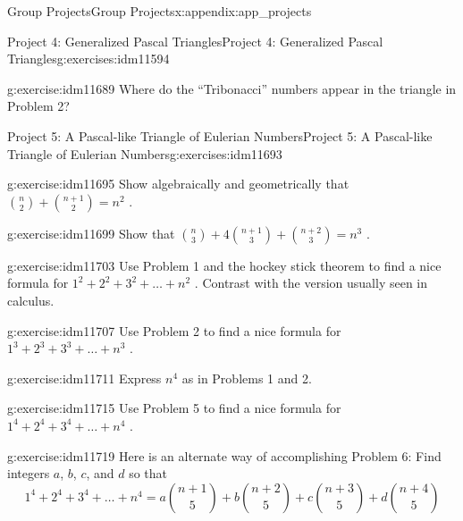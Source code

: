 \documentclass[oneside,10pt,]{book}
\numberwithin{equation}{chapter}
\begin{document}
\begin{appendixptx}{Group Projects}{}{Group Projects}{}{}{x:appendix:app_projects}
\begin{exercises-section-numberless}{Project 4: Generalized Pascal Triangles}{}{Project 4: Generalized Pascal Triangles}{}{}{g:exercises:idm11594}
\begin{divisionexercise}{8}{}{}{g:exercise:idm11689}%
Where do the ``Tribonacci'' numbers appear in the triangle in Problem 2?%
\end{divisionexercise}%
\end{exercises-section-numberless}
%
%
\typeout{************************************************}
\typeout{************************************************}
%
\begin{exercises-section-numberless}{Project 5: A Pascal-like Triangle of Eulerian Numbers}{}{Project 5: A Pascal-like Triangle of Eulerian Numbers}{}{}{g:exercises:idm11693}
\begin{divisionexercise}{1}{}{}{g:exercise:idm11695}%
Show algebraically and geometrically that \(\binom{n}{2}
+
\binom{n + 1}{2}
= n^{2}\) .%
\end{divisionexercise}%
\begin{divisionexercise}{2}{}{}{g:exercise:idm11699}%
Show that \(\binom{n}{3}
+ 4
\binom{n + 1}{3}
+
\binom{n + 2}{3}
= n^{3}\) .%
\end{divisionexercise}%
\begin{divisionexercise}{3}{}{}{g:exercise:idm11703}%
Use Problem 1 and the hockey stick theorem to find a nice formula for \(1^{2} + 2^{2} + 3^{2} + \ldots + n^{2}\) . Contrast with the version usually seen in calculus.%
\end{divisionexercise}%
\begin{divisionexercise}{4}{}{}{g:exercise:idm11707}%
Use Problem 2 to find a nice formula for \(1^{3} + 2^{3} + 3^{3} + \ldots + n^{3}\) .%
\end{divisionexercise}%
\begin{divisionexercise}{5}{}{}{g:exercise:idm11711}%
Express \(n^{4}\) as in Problems 1 and 2.%
\end{divisionexercise}%
\begin{divisionexercise}{6}{}{}{g:exercise:idm11715}%
Use Problem 5 to find a nice formula for \(1^{4} + 2^{4} + 3^{4} + \ldots + n^{4}\) .%
\end{divisionexercise}%
\begin{divisionexercise}{7}{}{}{g:exercise:idm11719}%
Here is an alternate way of accomplishing Problem 6:  Find integers \(a\), \(b\), \(c\), and \(d\) so that%
\begin{equation*}
1^{4} + 2^{4} + 3^{4} + \ldots + n^{4} = a\binom{n + 1}{5}  + b\binom{n + 2}{5}  + c\binom{n + 3}{5}  + d\binom{n + 4}{5}

\end{equation*}
\end{divisionexercise}
\end{exercises-section-numberless}
\end{appendixptx}
\end{document}
